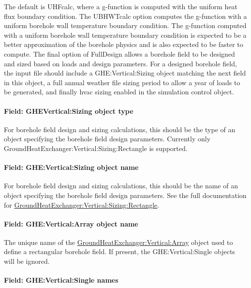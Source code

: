 The default is UHFcalc, where a g-function is computed with the uniform heat flux boundary condition.
The UBHWTcalc option computes the g-function with a uniform borehole wall temperature boundary condition.
The g-function computed with a uniform borehole wall temperature boundary condition is expected to be a better approximation of the borehole physics and is also expected to be faster to compute.
The final option of FullDesign allows a borehole field to be designed and sized based on loads and design parameters.
For a designed borehole field, the input file should include a GHE:Vertical:Sizing object matching the next field in this object, a full annual weather file sizing period to allow a year of loads to be generated, and finally hvac sizing enabled in the simulation control object.

\paragraph{Field: GHEVertical:Sizing object type}

For borehole field design and sizing calculations, this should be the type of an object specifying the borehole field design parameters.
Currently only GroundHeatExchanger:Vertical:Sizing:Rectangle is supported.

\paragraph{Field: GHE:Vertical:Sizing object name}

For borehole field design and sizing calculations, this should be the name of an object specifying the borehole field design parameters.
See the full documentation for \hyperref[groundheatexchangerverticalsizingrect]{GroundHeatExchanger:Vertical:Sizing:Rectangle}.

\paragraph{Field: GHE:Vertical:Array object name}

The unique name of the \hyperref[groundheatexchangerverticalarray]{GroundHeatExchanger:Vertical:Array} object used to define a rectangular borehole field. If present, the GHE:Vertical:Single objects will be ignored.

\paragraph{Field: GHE:Vertical:Single names}

